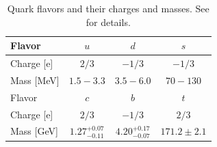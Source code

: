 \documentclass[twoside,12pt]{article}
\begin{document}
\begin{table}
\begin{center}
{\renewcommand{\baselinestretch}{1.5}\small\normalsize
\begin{tabular}{|l|c|c|c|}
\hline
Flavor&$u$&$d$&$s$\\
\hline
Charge [e] &$2/3$&$-1/3$&$-1/3$\\
\hline
Mass [MeV]&$1.5 - 3.3$ & $3.5 - 6.0$ & $70 - 130$\\
\hline \hline
Flavor&$c$&$b$&$t$\\
\hline
Charge [e] &$2/3$&$-1/3$&$2/3$\\
\hline
Mass [GeV] & $1.27^{+0.07}_{-0.11}$ & $4.20^{+0.17}_{-0.07}$ &$171.2\pm 2.1$\\
\hline
\end{tabular}
}
\caption{\label{2:2:table:quarks} Quark flavors and their charges
and masses. See \cite{Manohar_PDG} for details.}
\end{center}
\end{table}
\end{document}
